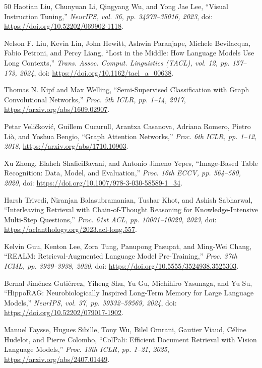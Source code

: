 \documentclass[conference,a4paper]{IEEEtran}
\begin{document}
\begin{thebibliography}{50}
 Haotian Liu, Chunyuan Li, Qingyang Wu, and Yong Jae Lee, ``Visual Instruction Tuning,'' \emph{NeurIPS, vol. 36, pp. 34979--35016, 2023}, doi: \url{https://doi.org/10.52202/069902-1118}.

 Nelson F. Liu, Kevin Lin, John Hewitt, Ashwin Paranjape, Michele Bevilacqua, Fabio Petroni, and Percy Liang, ``Lost in the Middle: How Language Models Use Long Contexts,'' \emph{Trans. Assoc. Comput. Linguistics (TACL), vol. 12, pp. 157--173, 2024}, doi: \url{https://doi.org/10.1162/tacl\_a\_00638}.

 Thomas N. Kipf and Max Welling, ``Semi-Supervised Classification with Graph Convolutional Networks,'' \emph{Proc. 5th ICLR, pp. 1--14, 2017}, \url{https://arxiv.org/abs/1609.02907}.

 Petar Veličković, Guillem Cucurull, Arantxa Casanova, Adriana Romero, Pietro Liò, and Yoshua Bengio, ``Graph Attention Networks,'' \emph{Proc. 6th ICLR, pp. 1--12, 2018}, \url{https://arxiv.org/abs/1710.10903}.

 Xu Zhong, Elaheh ShafieiBavani, and Antonio Jimeno Yepes, ``Image-Based Table Recognition: Data, Model, and Evaluation,'' \emph{Proc. 16th ECCV, pp. 564--580, 2020}, doi: \url{https://doi.org/10.1007/978-3-030-58589-1\_34}.

 Harsh Trivedi, Niranjan Balasubramanian, Tushar Khot, and Ashish Sabharwal, ``Interleaving Retrieval with Chain-of-Thought Reasoning for Knowledge-Intensive Multi-Step Questions,'' \emph{Proc. 61st ACL, pp. 10001--10020, 2023}, doi: \url{https://aclanthology.org/2023.acl-long.557}.

 Kelvin Guu, Kenton Lee, Zora Tung, Panupong Pasupat, and Ming-Wei Chang, ``REALM: Retrieval-Augmented Language Model Pre-Training,'' \emph{Proc. 37th ICML, pp. 3929--3938, 2020}, doi: \url{https://doi.org/10.5555/3524938.3525303}.

 Bernal Jiménez Gutiérrez, Yiheng Shu, Yu Gu, Michihiro Yasunaga, and Yu Su, ``HippoRAG: Neurobiologically Inspired Long-Term Memory for Large Language Models,'' \emph{NeurIPS, vol. 37, pp. 59532--59569, 2024}, doi: \url{https://doi.org/10.52202/079017-1902}.

 Manuel Faysse, Hugues Sibille, Tony Wu, Bilel Omrani, Gautier Viaud, Céline Hudelot, and Pierre Colombo, ``ColPali: Efficient Document Retrieval with Vision Language Models,'' \emph{Proc. 13th ICLR, pp. 1--21, 2025}, \url{https://arxiv.org/abs/2407.01449}.


\end{thebibliography}
\end{document}
